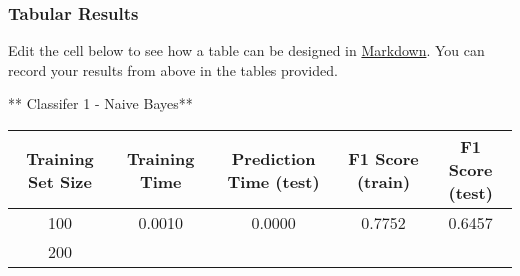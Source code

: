 \documentclass[11pt]{article}
\begin{document}
    \subsubsection{Tabular Results}\label{tabular-results}

Edit the cell below to see how a table can be designed in
\href{https://github.com/adam-p/markdown-here/wiki/Markdown-Cheatsheet\#tables}{Markdown}.
You can record your results from above in the tables provided.

    ** Classifer 1 - Naive Bayes**

\begin{longtable}[]{@{}ccccc@{}}
\toprule
\begin{minipage}[b]{0.16\columnwidth}\centering\strut
Training Set Size\strut
\end{minipage} & \begin{minipage}[b]{0.21\columnwidth}\centering\strut
Training Time\strut
\end{minipage} & \begin{minipage}[b]{0.20\columnwidth}\centering\strut
Prediction Time (test)\strut
\end{minipage} & \begin{minipage}[b]{0.15\columnwidth}\centering\strut
F1 Score (train)\strut
\end{minipage} & \begin{minipage}[b]{0.14\columnwidth}\centering\strut
F1 Score (test)\strut
\end{minipage}\tabularnewline
\midrule
\endhead
\begin{minipage}[t]{0.16\columnwidth}\centering\strut
100\strut
\end{minipage} & \begin{minipage}[t]{0.21\columnwidth}\centering\strut
0.0010\strut
\end{minipage} & \begin{minipage}[t]{0.20\columnwidth}\centering\strut
0.0000\strut
\end{minipage} & \begin{minipage}[t]{0.15\columnwidth}\centering\strut
0.7752\strut
\end{minipage} & \begin{minipage}[t]{0.14\columnwidth}\centering\strut
0.6457\strut
\end{minipage}\tabularnewline
\begin{minipage}[t]{0.16\columnwidth}\centering\strut
200\strut
\end{minipage} & \begin{minipage}[t]{0.21\columnwidth}\centering\strut

\end{minipage}
\end{longtable}
\end{document}
